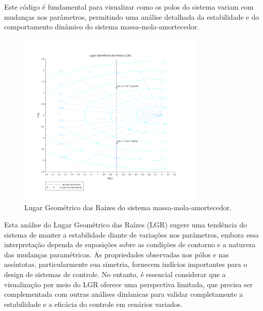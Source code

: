 Este código é fundamental para visualizar como os polos do sistema variam com mudanças nos parâmetros, permitindo uma análise detalhada da estabilidade e do comportamento dinâmico do sistema massa-mola-amortecedor.

\begin{figure}[h]
    \centering
    \includegraphics[width=0.8\textwidth]{atividades/7-atividade/assets/lgr.png}
    \caption{Lugar Geométrico das Raízes do sistema massa-mola-amortecedor.}
    \label{fig:LGR}
\end{figure}

Esta análise do Lugar Geométrico das Raízes (LGR) sugere uma tendência do sistema de manter a estabilidade diante de variações nos parâmetros, embora essa interpretação dependa de suposições sobre as condições de contorno e a natureza das mudanças paramétricas. As propriedades observadas nos pólos e nas assíntotas, particularmente sua simetria, fornecem indícios importantes para o design de sistemas de controle. No entanto, é essencial considerar que a visualização por meio do LGR oferece uma perspectiva limitada, que precisa ser complementada com outras análises dinâmicas para validar completamente a estabilidade e a eficácia do controle em cenários variados.

